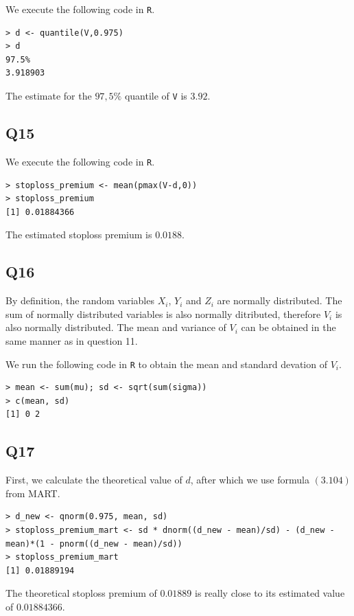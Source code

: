 We execute the following code in \verb|R|.

\begin{verbatim}
> d <- quantile(V,0.975)
> d
97.5% 
3.918903 
\end{verbatim}

The estimate for the $97,5\%$ quantile of \verb|V| is $3.92$.

\subsection*{Q15}

We execute the following code in \verb|R|.

\begin{verbatim}
> stoploss_premium <- mean(pmax(V-d,0)) 
> stoploss_premium
[1] 0.01884366
\end{verbatim}

The estimated stoploss premium is $0.0188$.

\subsection*{Q16}

By definition, the random variables $X_i$, $Y_i$ and $Z_i$ are normally distributed. The sum of normally distributed variables is also normally ditributed, therefore $V_i$ is also normally distributed. The mean and variance of $V_i$ can be obtained in the same manner as in question 11.

We run the following code in \verb|R| to obtain the mean and standard devation of $V_i$.

\begin{verbatim}
> mean <- sum(mu); sd <- sqrt(sum(sigma))
> c(mean, sd)
[1] 0 2
\end{verbatim}

\subsection*{Q17}

First, we calculate the theoretical value of $d$, after which we use formula $(3.104)$ from MART.

\begin{verbatim}
> d_new <- qnorm(0.975, mean, sd)
> stoploss_premium_mart <- sd * dnorm((d_new - mean)/sd) - (d_new - mean)*(1 - pnorm((d_new - mean)/sd))
> stoploss_premium_mart
[1] 0.01889194
\end{verbatim}

The theoretical stoploss premium of $0.01889$ is really close to its estimated value of $0.01884366$.

